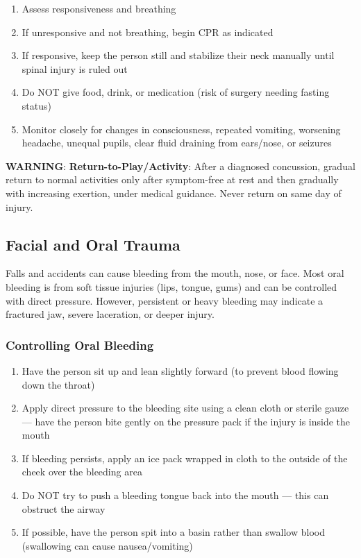 \begin{enumerate}[leftmargin=*]
  \item Assess responsiveness and breathing
  \item If unresponsive and not breathing, begin CPR as indicated
  \item If responsive, keep the person still and stabilize their neck manually until spinal injury is ruled out
  \item Do NOT give food, drink, or medication (risk of surgery needing fasting status)
  \item Monitor closely for changes in consciousness, repeated vomiting, worsening headache, unequal pupils, clear fluid draining from ears/nose, or seizures
\end{enumerate}
\textbf{WARNING}: \textbf{Return-to-Play/Activity}: After a diagnosed concussion, gradual return to normal activities only after symptom-free at rest and then gradually with increasing exertion, under medical guidance. Never return on same day of injury.

\subsection{Facial and Oral Trauma}

Falls and accidents can cause bleeding from the mouth, nose, or face. Most oral bleeding is from soft tissue injuries (lips, tongue, gums) and can be controlled with direct pressure. However, persistent or heavy bleeding may indicate a fractured jaw, severe laceration, or deeper injury.

\subsubsection{Controlling Oral Bleeding}

\begin{enumerate}[leftmargin=*]
  \item Have the person sit up and lean slightly forward (to prevent blood flowing down the throat)
  \item Apply direct pressure to the bleeding site using a clean cloth or sterile gauze — have the person bite gently on the pressure pack if the injury is inside the mouth
  \item If bleeding persists, apply an ice pack wrapped in cloth to the outside of the cheek over the bleeding area
  \item Do NOT try to push a bleeding tongue back into the mouth — this can obstruct the airway
  \item If possible, have the person spit into a basin rather than swallow blood (swallowing can cause nausea/vomiting)
\end{enumerate}
